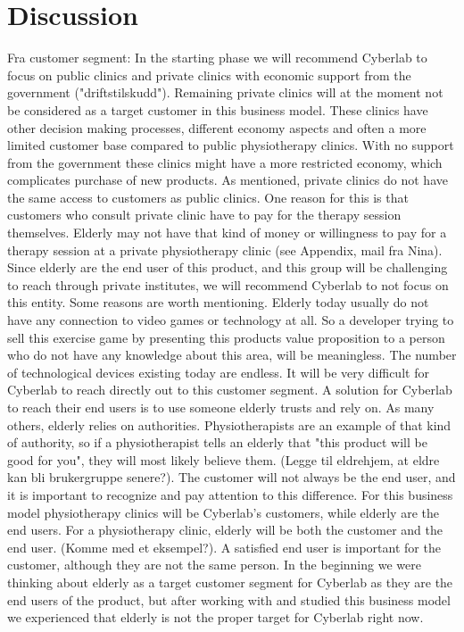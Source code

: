 \section{Discussion}
Fra customer segment: In the starting phase we will recommend Cyberlab to focus on public clinics and private clinics with economic support from the government ("driftstilskudd"). Remaining private clinics will at the moment not be considered as a target customer in this business model. These clinics have other decision making processes, different economy aspects and often a more limited customer base compared to public physiotherapy clinics. With no support from the government these clinics might have a more restricted economy, which complicates purchase of new products. As mentioned, private clinics do not have the same access to customers as public clinics. One reason for this is that customers who consult private clinic have to pay for the therapy session themselves. Elderly may not have that kind of money or willingness to pay for a therapy session at a private physiotherapy clinic (see Appendix, mail fra Nina). Since elderly are the end user of this product, and this group will be challenging to reach through private institutes, we will recommend Cyberlab to not focus on this entity. Some reasons are worth mentioning. Elderly today usually do not have any connection to video games or technology at all. So a developer trying to sell this exercise game by presenting this products value proposition to a person who do not have any knowledge about this area, will be meaningless. The number of technological devices existing today are endless. It will be very difficult for Cyberlab to reach directly out to this customer segment. A solution for Cyberlab to reach their end users is to use someone elderly trusts and rely on. As many others, elderly relies on authorities. Physiotherapists are an example of that kind of authority, so if a physiotherapist tells an elderly that "this product will be good for you", they will most likely believe them. (Legge til eldrehjem, at eldre kan bli brukergruppe senere?). The customer will not always be the end user, and it is important to recognize and pay attention to this difference. For this business model physiotherapy clinics will be Cyberlab's customers, while elderly are the end users. For a physiotherapy clinic, elderly will be both the customer and the end user. (Komme med et eksempel?). A satisfied end user is important for the customer, although they are not the same person. In the beginning we were thinking about elderly as a target customer segment for Cyberlab as they are the end users of the product, but after working with and studied this business model we experienced that elderly is not the proper target for Cyberlab right now. \\ \\
